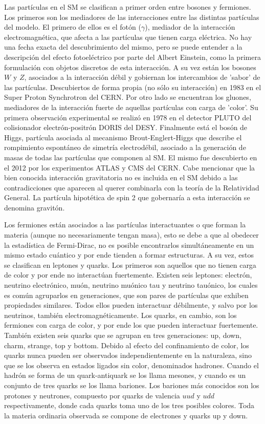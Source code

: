Las partículas en el SM se clasifican a primer orden entre bosones y fermiones. Los primeros son los mediadores de las interacciones entre las distintas partículas del modelo. El primero de ellos es el fotón ($\gamma$), mediador de la interacción electromagnética, que afecta a las partículas que tienen carga eléctrica. No hay una fecha exacta del descubrimiento del mismo, pero se puede entender a la descripción del efecto fotoeléctrico por parte del Albert Einstein, como la primera formulación con objetos discretos de esta interacción. A su vez están los bosones $W$ y $Z$, asociados a la interacción débil y gobiernan los intercambios de 'sabor' de las partículas. Descubiertos de forma propia (no sólo su interacción) en 1983 en el Super Proton Synchrotron del CERN. Por otro lado se encuentran los gluones, mediadores de la interacción fuerte de aquellas partículas con carga de 'color'. Su primera observación experimental se realizó en 1978 en el detector PLUTO del colisionador electrón-positrón DORIS del DESY. Finalmente está el bosón de Higgs, partícula asociada al mecanismo Brout-Englert-Higgs que describe el rompimiento espontáneo de simetría electrodébil, asociado a la generación de masas de todas las partículas que componen al SM. El mismo fue descubierto en el 2012 por los experimentos ATLAS y CMS del CERN. Cabe mencionar que la bien conocida interacción gravitatoria no es incluida en el SM debido a las contradicciones que aparecen al querer combinarla con la teoría de la Relatividad General. La partícula hipotética de spin 2 que gobernaría a esta interacción se denomina gravitón.

Los fermiones están asociados a las partículas interactuantes o que forman la materia (aunque no necesariamente tengan masa), esto se debe a que al obedecer la estadística de Fermi-Dirac, no es posible encontrarlos simultáneamente en un mismo estado cuántico y por ende tienden a formar estructuras. A su vez, estos se clasifican en leptones y quarks. Los primeros son aquellos que no tienen carga de color y por ende no interactúan fuertemente. Existen seis leptones: electrón, neutrino electrónico, muón, neutrino muónico tau y neutrino tauónico, los cuales es común agruparlos en generaciones, que son pares de partículas que exhiben propiedades similares. Todos ellos pueden interactuar débilmente, y salvo por los neutrinos, también electromagnéticamente. Los quarks, en cambio, son los fermiones con carga de color, y por ende los que pueden interactuar fuertemente. También existen seis quarks que se agrupan en tres generaciones: up, down, charm, strange, top y bottom. Debido al efecto del confinamiento de color, los quarks nunca pueden ser observados independientemente en la naturaleza, sino que se los observa en estados ligados sin color, denominados hadrones. Cuando el hadrón se forma de un quark-antiquark se los llama mesones, y cuando es un conjunto de tres quarks se los llama bariones. Los bariones más conocidos son los protones y neutrones, compuesto por quarks de valencia $uud$ y $udd$ respectivamente, donde cada quarks toma uno de los tres posibles colores. Toda la materia ordinaria observada se compone de electrones y quarks up y down.

